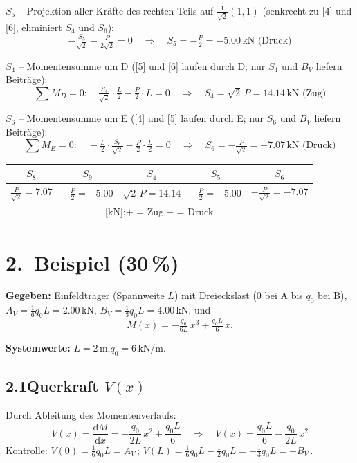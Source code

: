 \documentclass[a4paper,11pt]{article}
\begin{document}
\textbf{$S_5$} -- Projektion aller Kräfte des rechten Teils auf $\tfrac{1}{\sqrt{2}}(1,1)$
(senkrecht zu [4] und [6], eliminiert $S_4$ und $S_6$):
\[
  -\tfrac{S_5}{\sqrt{2}} - \tfrac{P}{2\sqrt{2}} = 0
  \quad\Rightarrow\quad \boxed{S_5 = -\tfrac{P}{2} = -5.00\,\text{kN (Druck)}}
\]

\textbf{$S_4$} -- Momentensumme um D
([5] und [6] laufen durch D; nur $S_4$ und $B_V$ liefern Beiträge):
\[
  \sum M_D = 0:\quad \tfrac{S_4}{\sqrt{2}}\cdot\tfrac{L}{2} - \tfrac{P}{2}\cdot L = 0
  \quad\Rightarrow\quad \boxed{S_4 = \sqrt{2}\,P = 14.14\,\text{kN (Zug)}}
\]

\textbf{$S_6$} -- Momentensumme um E
([4] und [5] laufen durch E; nur $S_6$ und $B_V$ liefern Beiträge):
\[
  \sum M_E = 0:\quad -\tfrac{L}{2}\cdot\tfrac{S_6}{\sqrt{2}} - \tfrac{P}{2}\cdot\tfrac{L}{2} = 0
  \quad\Rightarrow\quad \boxed{S_6 = -\tfrac{P}{\sqrt{2}} = -7.07\,\text{kN (Druck)}}
\]

\medskip
\begin{center}
\begin{tabular}{ccccc}
\toprule
$S_8$ & $S_9$ & $S_4$ & $S_5$ & $S_6$ \\
\midrule
$\tfrac{P}{\sqrt{2}} = 7.07$ & $-\tfrac{P}{2} = -5.00$ &
$\sqrt{2}\,P = 14.14$ & $-\tfrac{P}{2} = -5.00$ & $-\tfrac{P}{\sqrt{2}} = -7.07$ \\
\multicolumn{5}{c}{\small [kN];\quad $+$ = Zug,\quad $-$ = Druck} \\
\bottomrule
\end{tabular}
\end{center}

\newpage
\section*{2.~Beispiel \hfill (30\,\%)}

\textbf{Gegeben:} Einfeldträger (Spannweite $L$) mit Dreieckslast
(0 bei A bis $q_0$ bei B),
$A_V = \tfrac{1}{6}q_0 L = 2.00$\,kN,
$B_V = \tfrac{1}{3}q_0 L = 4.00$\,kN, und
\[
  M(x) = -\tfrac{q_0}{6L}\,x^3 + \tfrac{q_0 L}{6}\,x.
\]

\textbf{Systemwerte:} $L = 2$\,m,\quad $q_0 = 6$\,kN/m.

\subsection*{2.1\quad Querkraft $V(x)$}

Durch Ableitung des Momentenverlaufs:
\[
  V(x) = \frac{\mathrm{d}M}{\mathrm{d}x}
        = -\frac{q_0}{2L}\,x^2 + \frac{q_0 L}{6}
  \quad\Rightarrow\quad
  \boxed{V(x) = \frac{q_0 L}{6} - \frac{q_0}{2L}\,x^2}
\]
Kontrolle: $V(0) = \tfrac{1}{6}q_0 L = A_V$\,\checkmark;\quad
$V(L) = \tfrac{1}{6}q_0 L - \tfrac{1}{2}q_0 L = -\tfrac{1}{3}q_0 L = -B_V$\,\checkmark.
\end{document}
